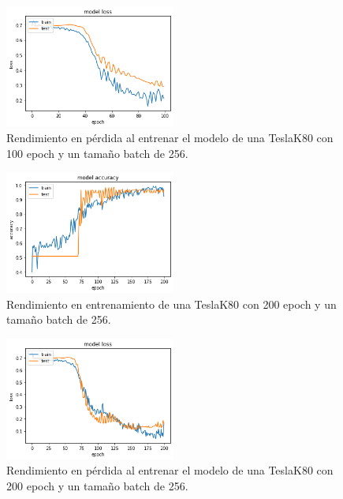 \begin{figure}
    \centering
    \includegraphics[width=0.5\textwidth]{images/chapter5/batch_256_100_epoch_loss.png}
    \caption{Rendimiento en pérdida al entrenar el modelo de una TeslaK80 con 100 epoch y un tamaño batch de 256.}
    \label{fig:Resultados de loss en el entrenamiento con un batch-size de 256 y 100 epochs}
\end{figure}

\begin{figure}
    \centering
    \includegraphics[width=0.5\textwidth]{images/chapter5/batch_256_200_epoch.png}
    \caption{Rendimiento en entrenamiento de una TeslaK80 con 200 epoch y un tamaño batch de 256.}
    \label{fig:Resultados de la precisión de entrenamiento con un batch-size de 256 y 200 epochs}
\end{figure}

\begin{figure}
    \centering
    \includegraphics[width=0.5\textwidth]{images/chapter5/batch_256_200_epoch_loss.png}
    \caption{Rendimiento en pérdida al entrenar el modelo de una TeslaK80 con 200 epoch y un tamaño batch de 256.}
    \label{fig:Resultados de loss en el entrenamiento con un batch-size de 256 y 200 epochs}
\end{figure}



